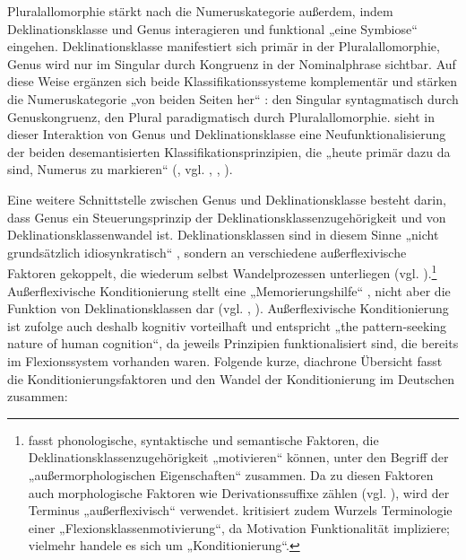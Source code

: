 Pluralallomorphie stärkt nach \citet{Nübling2008, Nübling2016} die Numeruskategorie außerdem, indem Deklinationsklasse und Genus interagieren und funktional „eine Symbiose“ \citep[167]{Nübling2016} eingehen. Deklinationsklasse manifestiert sich primär in der Pluralallomorphie, Genus wird nur im Singular durch Kongruenz in der Nominalphrase sichtbar. Auf diese Weise ergänzen sich beide Klassifikationssysteme komplementär und stärken die Numeruskategorie „von beiden Seiten her“ \citep[309]{Nübling2008}: den Singular syntagmatisch durch Genuskongruenz, den Plural paradigmatisch durch Pluralallomorphie. \citet{Nübling2016} sieht in dieser Interaktion von Genus und Deklinationsklasse eine Neufunktionalisierung der beiden desemantisierten Klassifikationsprinzipien, die „heute primär dazu da sind, Numerus zu markieren“ (\citealt[155]{Nübling2016}, vgl. \citealt[206--208]{DammelGillmann2014}, \citealt[364--365]{Kürschner2008a}, \citealt{KürschnerNübling2011}).

Eine weitere Schnittstelle zwischen Genus und Deklinationsklasse besteht darin, dass Genus ein Steuerungsprinzip der Deklinationsklassenzugehörigkeit und von Deklinationsklassenwandel ist. Deklinationsklassen sind in diesem Sinne „nicht grundsätzlich idiosynkratisch“ \citep[28]{Kürschner2008a}, sondern an verschiedene außerflexivische Faktoren gekoppelt, die wiederum selbst Wandelprozessen unterliegen (vgl. \citealt[91]{Wurzel1986}).\footnote{\citet[91]{Wurzel1986} fasst phonologische, syntaktische und semantische Faktoren, die Deklinationsklassenzugehörigkeit „motivieren“ können, unter den Begriff der „außermorphologischen Eigenschaften“ zusammen. Da zu diesen Faktoren auch morphologische Faktoren wie Derivationssuffixe zählen (vgl. \citealt[60]{Kürschner2008a}), wird der Terminus „außerflexivisch“ verwendet. \citet[284--285]{Nübling2008} kritisiert zudem Wurzels Terminologie einer „Flexionsklassenmotivierung“, da Motivation Funktionalität impliziere; vielmehr handele es sich um „Konditionierung“.} Außerflexivische Konditionierung stellt eine „Memorierungshilfe“ \citep[285]{Nübling2008}, nicht aber die Funktion von Deklinationsklassen dar (vgl. \citealt[79]{Bittner1994}, \citealt[137]{Harnisch1987}). Außerflexivische Konditionierung ist \citet[311]{DammelKürschner2018} zufolge auch deshalb kognitiv vorteilhaft und entspricht „the pattern-seeking nature of human cognition“, da jeweils Prinzipien funktionalisiert sind, die bereits im Flexionssystem vorhanden waren. Folgende kurze, diachrone Übersicht fasst die Konditionierungsfaktoren und den Wandel der Konditionierung im Deutschen zusammen:

